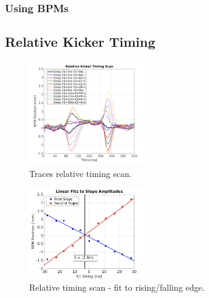 \subsubsection{Using BPMs}
\label{sss:relativeBPM}

\subsection{Relative Kicker Timing}
\label{ss:relativeTiming}

\begin{figure}
  \centering
  \includegraphics[width=0.45\textwidth]{Figures/commissioning/relativeTimingScan_traces}
  \caption{Traces relative timing scan.}
  \label{f:relativeTimingScan_traces}
\end{figure}

\begin{figure}
  \centering
  \includegraphics[width=0.45\textwidth]{Figures/commissioning/relativeTimingScan_slopeFit}
  \caption{Relative timing scan - fit to rising/falling edge.}
  \label{f:relativeTimingScan_slopeFit}
\end{figure}







